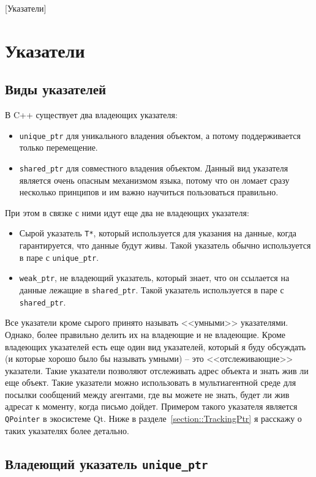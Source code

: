 [Указатели]


\section{Указатели}
\label{section::Ptrs}

\subsection{Виды указателей}

В C++ существует два владеющих указателя:
\begin{itemize}
\item \texttt{unique\_ptr} для уникального владения объектом, а потому поддерживается только перемещение.

\item \texttt{shared\_ptr} для совместного владения объектом.
Данный вид указателя является очень опасным механизмом языка, потому что он ломает сразу несколько принципов и им важно научиться пользоваться правильно.
\end{itemize}
При этом в связке с ними идут еще два не владеющих указателя:
\begin{itemize}
\item Сырой указатель \texttt{T*}, который используется для указания на данные, когда гарантируется, что данные будут живы.
Такой указатель обычно используется в паре с \texttt{unique\_ptr}.

\item \texttt{weak\_ptr}, не владеющий указатель, который знает, что он ссылается на данные лежащие в \texttt{shared\_ptr}.
Такой указатель используется в паре с \texttt{shared\_ptr}.
\end{itemize}

Все указатели кроме сырого принято называть <<умными>> указателями.
Однако, более правильно делить их на владеющие и не владеющие.
Кроме владеющих указателей есть еще один вид указателей, который я буду обсуждать (и которые хорошо было бы называть умными) -- это <<отслеживающие>> указатели.
Такие указатели позволяют отслеживать адрес объекта и знать жив ли еще объект.
Такие указатели можно использовать в мультиагентной среде для посылки сообщений между агентами, где вы можете не знать, будет ли жив адресат к моменту, когда письмо дойдет.
Примером такого указателя является \texttt{QPointer} в экосистеме Qt.
Ниже в разделе~\ref{section::TrackingPtr} я расскажу о таких указателях более детально.

\subsection{Владеющий указатель \texttt{unique\_ptr}}
\label{section::UniquePtr}

